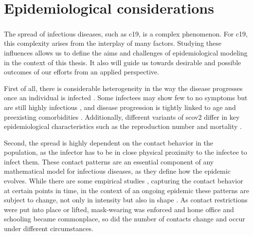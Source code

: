\glsresetall
\chapter{Epidemiological considerations}
\label{chap:epidemiological_considerations}
\begin{tcolorbox}[title={Contributions of this chapter}]
    
    \paragraph{}

    \paragraph{}

    \paragraph{}

    \paragraph{}

\end{tcolorbox}
\newpage

The spread of infectious diseases, such as \acrshort{c19}, is a complex phenomenon. For \acrshort{c19}, this complexity arises from the interplay of many factors. Studying these influences allows us to define the aims and challenges of epidemiological modeling in the context of this thesis. It also will guide us towards desirable and possible outcomes of our efforts from an applied perspective.

First of all, there is considerable heterogeneity in the way the disease progresses once an individual is infected \citep{Salzberger2021Epidemiology}. Some infectees may show few to no symptoms but are still highly infectious \citep{Byambasuren2020Estimating}, and disease progression is tightly linked to age and preexisting comorbidities \citep{Biswas2020Association}. Additionally, different variants of \acrshort{scov2} differ in key epidemiological characteristics such as the reproduction number \citep{Du2022Reproduction} and mortality \citep{Hughes2023Effect}. 

Second, the spread is highly dependent on the contact behavior in the population, as the infector has to be in close physical proximity to the infectee to infect them. These contact patterns are an essential component of any mathematical model for infectious diseases, as they define how the epidemic evolves. While there are some empirical studies \citep{Tomori2021Individual,Mossong2008Social}, capturing the contact behavior at certain points in time, in the context of an ongoing epidemic these patterns are subject to change, not only in intensity but also in shape \citep{Tomori2021Individual}. As contact restrictions were put into place or lifted, mask-wearing was enforced and home office and schooling became commonplace, so did the number of contacts change and occur under different circumstances. 

